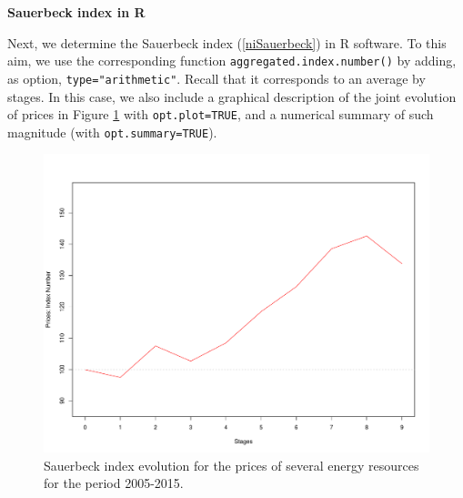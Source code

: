 \vspace*{0.15 cm}\noindent\textbf{Sauerbeck index in R}

\noindent Next, we determine the Sauerbeck index (\ref{niSauerbeck}) in R software. To this aim, we use the corresponding function \verb|aggregated.index.number()| by adding, as option, \verb|type="arithmetic"|. Recall that it corresponds to an average by stages. In this case, we also include a graphical description of the joint evolution of prices in Figure \ref{sauerbeck} with \verb|opt.plot=TRUE|, and a numerical summary of such magnitude (with \verb|opt.summary=TRUE|).

\begin{figure}[htbp]
	\centering
	\includegraphics[scale=0.4]{sauerbeck_new.pdf}
	\caption{Sauerbeck index evolution for the prices of several energy resources for the period 2005-2015.}
	\label{sauerbeck}
\end{figure}

